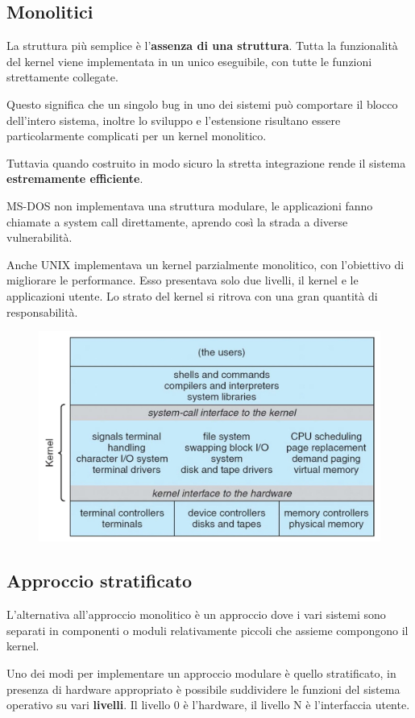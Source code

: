 \subsection{Monolitici}
La struttura più semplice è l'\textbf{assenza di una struttura}. Tutta la funzionalità del kernel viene implementata in un unico eseguibile, con tutte le funzioni strettamente collegate.

\spacer
Questo significa che un singolo bug in uno dei sistemi può comportare il blocco dell'intero sistema, inoltre lo sviluppo e l'estensione risultano essere particolarmente complicati per un kernel monolitico.

Tuttavia quando costruito in modo sicuro la stretta integrazione rende il sistema \textbf{estremamente efficiente}.

\begin{note}
    MS-DOS non implementava una struttura modulare, le applicazioni fanno chiamate a system call direttamente, aprendo così la strada a diverse vulnerabilità.

    \spacer
    Anche UNIX implementava un kernel parzialmente monolitico, con l'obiettivo di migliorare le performance.
    Esso presentava solo due livelli, il kernel e le applicazioni utente. Lo strato del kernel si ritrova con una gran quantità di responsabilità.

    \begin{figure}[H]
        \centering
        \includegraphics[width=0.5\linewidth]{assets/unix-monolithic.jpeg}
    \end{figure}
\end{note}

\subsection{Approccio stratificato}
L'alternativa all'approccio monolitico è un approccio dove i vari sistemi sono separati in componenti o moduli relativamente piccoli che assieme compongono il kernel.

\spacer
Uno dei modi per implementare un approccio modulare è quello stratificato, in presenza di hardware appropriato è possibile suddividere le funzioni del sistema operativo su vari \textbf{livelli}. Il livello 0 è l'hardware, il livello N è l'interfaccia utente.

